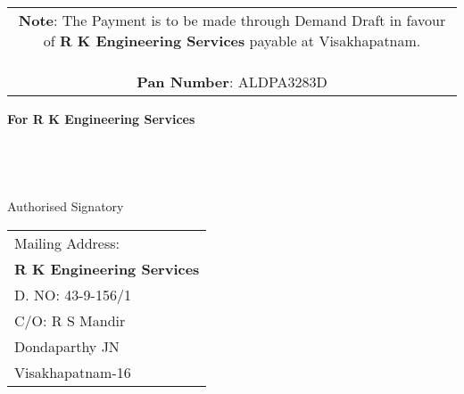 \documentclass[11pt]{article}
\begin{document}
\vspace*{-2.25cm}
\noindent \begin{tabular}{c}
\parbox{4in}{ {\bf Note}: The Payment is to be made through Demand Draft in favour of {\bf R K Engineering Services} payable at Visakhapatnam. \\ \\
{\noindent \bf Pan Number}:  ALDPA3283D }\\
\end{tabular}
\vspace*{105pt}


{\bf For  R K Engineering Services } \\ \\ \\ \\ \\
 \hspace*{0.6cm}Authorised Signatory
\vspace*{-72pt}
\begin{flushright}
\begin{tabular}{l}
Mailing Address:\\
{\bf R K Engineering Services}\\
D. NO: 43-9-156/1\\
C/O: R S Mandir\\
Dondaparthy JN\\ 
Visakhapatnam-16\\
\end{tabular}
\end{flushright}
\end{document}
